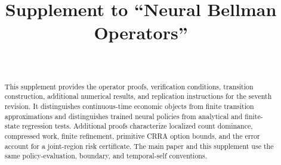 \documentclass[ecta]{econsocart}
\begin{document}
\begin{frontmatter}
\title{Supplement to ``Neural Bellman Operators''}
\begin{aug}
\author[id=au1,addressref={add1}]{~}
\address[id=add1]{}
\end{aug}
\begin{abstract}
This supplement provides the operator proofs, verification conditions, transition construction, additional numerical results, and replication instructions for the seventh revision. It distinguishes continuous-time economic objects from finite transition approximations and distinguishes trained neural policies from analytical and finite-state regression tests. Additional proofs characterize localized count dominance, compressed work, finite refinement, primitive CRRA option bounds, and the error account for a joint-region risk certificate. The main paper and this supplement use the same policy-evaluation, boundary, and temporal-self conventions.
\end{abstract}
\end{frontmatter}












\end{document}
